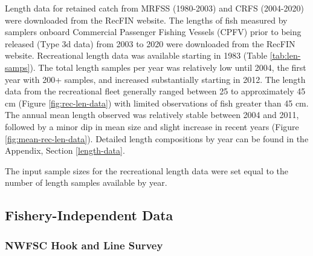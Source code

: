 \documentclass[11pt,
  english,
  a4paper,
]{article}
\begin{document}
Length data for retained catch from MRFSS (1980-2003) and CRFS (2004-2020) were downloaded from the RecFIN website. The lengths of fish measured by samplers onboard Commercial Passenger Fishing Vessels (CPFV) prior to being released (Type 3d data) from 2003 to 2020 were downloaded from the RecFIN website. Recreational length data was available starting in 1983 (Table \ref{tab:len-samps}). The total length samples per year was relatively low until 2004, the first year with 200+ samples, and increased substantially starting in 2012. The length data from the recreational fleet generally ranged between 25 to approximately 45 cm (Figure \ref{fig:rec-len-data}) with limited observations of fish greater than 45 cm. The annual mean length observed was relatively stable between 2004 and 2011, followed by a minor dip in mean size and slight increase in recent years (Figure \ref{fig:mean-rec-len-data}). Detailed length compositions by year can be found in the Appendix, Section \ref{length-data}.

\leavevmode\tagmcend\tagstructend\par


The input sample sizes for the recreational length data were set equal to the number of length samples available by year.

\leavevmode\tagmcend\tagstructend\par


\hypertarget{fishery-independent-data}{%
\subsection{Fishery-Independent Data}\label{fishery-independent-data}}

\leavevmode\tagmcend\tagstructend


\hypertarget{nwfsc-hook-and-line-survey}{%
\subsubsection{NWFSC Hook and Line Survey}\label{nwfsc-hook-and-line-survey}}

\leavevmode\tagmcend\tagstructend

\end{document}
